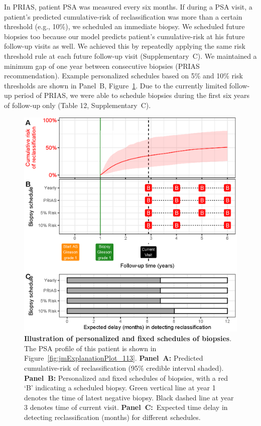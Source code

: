 In PRIAS, patient PSA was measured every six months. If during a PSA visit, a patient's predicted cumulative-risk of reclassification was more than a certain threshold (e.g., 10\%), we scheduled an immediate biopsy. We scheduled future biopsies too because our model predicts patient's cumulative-risk at his future follow-up visits as well. We achieved this by repeatedly applying the same risk threshold rule at each future follow-up visit (Supplementary~C). We maintained a minimum gap of one year between consecutive biopsies (PRIAS recommendation). Example personalized schedules based on 5\% and 10\% risk thresholds are shown in Panel~B, Figure~\ref{fig:demo_pat1}. Due to the currently limited follow-up period of PRIAS, we were able to schedule biopsies during the first six years of follow-up only (Table 12, Supplementary~C).

\begin{figure}[!htb]
\centerline{\includegraphics[width=\columnwidth]{images/demo_pat1.eps}}
\caption{\textbf{Illustration of personalized and fixed schedules of biopsies}. The PSA profile of this patient is shown in Figure~\ref{fig:jmExplanationPlot_113}. \textbf{Panel~A:} Predicted cumulative-risk of reclassification (95\% credible interval shaded). \textbf{Panel~B:} Personalized and fixed schedules of biopsies, with a red `B' indicating a scheduled biopsy. Green vertical line at year 1 denotes the time of latest negative biopsy. Black dashed line at year 3 denotes time of current visit. \textbf{Panel~C:}\ Expected time delay in detecting reclassification (months) for different schedules.}
\label{fig:demo_pat1}
\end{figure}

